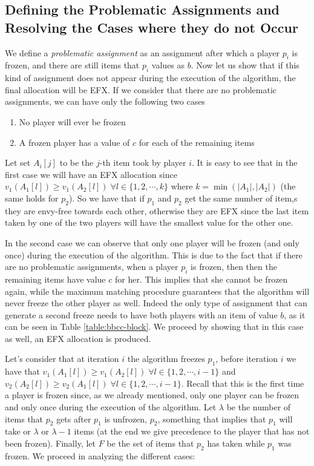\subsection{Defining the Problematic Assignments and Resolving the Cases where they do not Occur}


We define a \emph{problematic assignment} as an assignment after which a player $p_i$ is frozen, and there are still items that $p_i$ values as $b$. Now let us show that if this kind of assignment does not appear during the execution of the algorithm, the final allocation will be EFX. If we consider that there are no problematic assignments, we can have only the following two cases
\begin{enumerate}
    \item No player will ever be frozen
    \item A frozen player has a value of $c$ for each of the remaining items 
\end{enumerate}

Let set $A_i[j]$ to be the $j$-th item took by player $i$. It is easy to see that in the first case we will have an EFX allocation since  $v_1(A_1[l])\ge v_1(A_2[l])\; \forall l \in \{1,2,\cdots,k\}$ where $k = \min (|A_1|, |A_2|)$ (the same holds for $p_2$).
So we have that if $p_1$ and $p_2$ get the same number of item,s they are envy-free towards each other, otherwise they are EFX since the last item taken by one of the two players will have the smallest value for the other one.

 In the second case we can observe that only one player will be frozen (and only once) during the execution of the algorithm. This is due to the fact that if there are no problematic assignments, when a player $p_i$ is frozen, then then the remaining items have value $c$ for her. This implies that she cannot be frozen again, while the maximum matching procedure guarantees that the algorithm will never freeze the other player as well.  Indeed the only type of assignment that can generate a second freeze needs to have both players with an item of value $b$, as it can be seen in Table \ref{table:bbcc-block}. We proceed by showing that in this case as well, an EFX allocation is produced.
 
Let's consider that at iteration $i$ the algorithm freezes $p_1$, before iteration $i$ we have that $v_1(A_1[l])\ge v_1(A_2[l]) \; \forall l \in \{1,2,\cdots, i-1\}$ and $v_2(A_2[l]) \ge v_2(A_1[l])\;\forall l \in \{1,2,\cdots,i-1\}$. Recall that this is the first time a player is frozen since, as we already mentioned,  only one player can be frozen and only once during the execution of the algorithm.  Let $\lambda$ be the number of items that $p_2$ gets after $p_1$ is unfrozen, $p_2$, something that implies that $p_1$ will take or $\lambda$ or $\lambda-1$ items (at the end we give precedence to the player that has not been frozen).
Finally, let $F$ be the set of items that $p_2$ has taken while $p_1$ was frozen. We proceed in analyzing the different cases:

